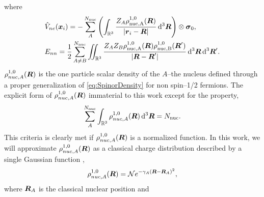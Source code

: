 where
\begin{align}
  &\hat{V}_{ne}(\boldsymbol{x}_i) = 
    -\sum^{N_\mathrm{nuc}}_A \left(\int_{\mathbb R^3} \frac{Z_A\rho^{1,0}_\mathrm{nuc,A}(\boldsymbol{R})}{\vert \boldsymbol{r}_i - \boldsymbol{R} \vert} \,\mathrm{d}^3\boldsymbol{R}\right) \otimes \boldsymbol{\sigma}_{0}, \\
&E_{nn} = \frac{1}{2} \sum^{N_\mathrm{nuc}}_{A\neq B} \int\mkern-12mu\int_{\mathbb R^3} \frac{Z_AZ_B\rho^{1,0}_\mathrm{nuc,A}(\boldsymbol{R})\rho^{1,0}_\mathrm{nuc,B}(\boldsymbol{R}')}{\vert \boldsymbol{R} - \boldsymbol{R}' \vert} \,\mathrm{d}^3\boldsymbol{R} \,\mathrm{d}^3\boldsymbol{R}'.
\end{align}
$\rho^{1,0}_{nuc,A}(\boldsymbol{R})$ is the one particle scalar density of the $A$--the nucleus defined through a proper generalization of
\cref{eq:SpinorDensity} for non spin--1/2 fermions. The explicit form of $\rho^{1,0}_{nuc,A}(\boldsymbol{R})$ immaterial
to this work except for the property,
\begin{equation}
\sum_A^{N_\mathrm{nuc}} \int_{\mathbb R^3} \rho_{nuc,A}^{1,0}(\boldsymbol{R}) \,\mathrm{d}^3\boldsymbol{R} = N_\mathrm{nuc}.
\end{equation}
This criteria is clearly met if $\rho^{1,0}_{nuc,A}(\boldsymbol{R})$ is a normalized function. In this work, we will approximate
$\rho^{1,0}_{nuc,A}(\boldsymbol{R})$ as a classical charge distribution described by a single Gaussian function ,
\begin{equation}
\rho^{1,0}_{nuc,A}(\boldsymbol{R}) = \mathcal{N} e^{-\gamma_A(\boldsymbol{R} - \boldsymbol{R}_A)^2},
\end{equation}
where $\boldsymbol{R}_A$ is the classical nuclear position and 


